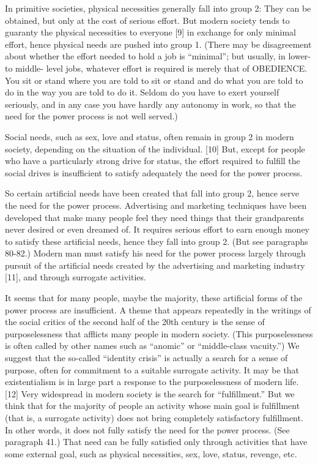  In primitive societies, physical necessities generally fall into group 2: They can be obtained, but only at the cost of serious effort. But modern society tends to guaranty the physical necessities to everyone [9] in exchange for only minimal effort, hence physical needs are pushed into group 1. (There may be disagreement about whether the effort needed to hold a job is “minimal”; but usually, in lower- to middle- level jobs, whatever effort is required is merely that of OBEDIENCE. You sit or stand where you are told to sit or stand and do what you are told to do in the way you are told to do it. Seldom do you have to exert yourself seriously, and in any case you have hardly any autonomy in work, so that the need for the power process is not well served.)

 Social needs, such as sex, love and status, often remain in group 2 in modern society, depending on the situation of the individual. [10] But, except for people who have a particularly strong drive for status, the effort required to fulfill the social drives is insufficient to satisfy adequately the need for the power process.

 So certain artificial needs have been created that fall into group 2, hence serve the need for the power process. Advertising and marketing techniques have been developed that make many people feel they need things that their grandparents never desired or even dreamed of. It requires serious effort to earn enough money to satisfy these artificial needs, hence they fall into group 2. (But see paragraphs 80-82.) Modern man must satisfy his need for the power process largely through pursuit of the artificial needs created by the advertising and marketing industry [11], and through surrogate activities.

 It seems that for many people, maybe the majority, these artificial forms of the power process are insufficient. A theme that appears repeatedly in the writings of the social critics of the second half of the 20th century is the sense of purposelessness that afflicts many people in modern society. (This purposelessness is often called by other names such as “anomic” or “middle-class vacuity.”) We suggest that the so-called “identity crisis” is actually a search for a sense of purpose, often for commitment to a suitable surrogate activity. It may be that existentialism is in large part a response to the purposelessness of modern life. [12] Very widespread in modern society is the search for “fulfillment.” But we think that for the majority of people an activity whose main goal is fulfillment (that is, a surrogate activity) does not bring completely satisfactory fulfillment. In other words, it does not fully satisfy the need for the power process. (See paragraph 41.) That need can be fully satisfied only through activities that have some external goal, such as physical necessities, sex, love, status, revenge, etc.

